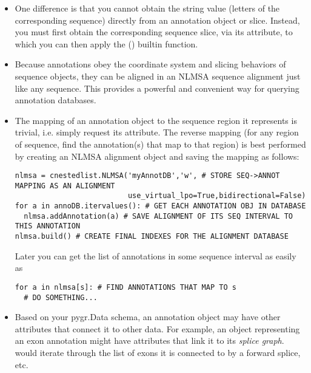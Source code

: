 \documentclass{howto}
\begin{document}
\begin{itemize}
\item One difference is that you cannot obtain the string value
(letters of the corresponding sequence) directly from an annotation
object or slice.  Instead, you must first obtain the corresponding
sequence slice, via its  attribute, to which
you can then apply the () builtin function.

\item Because annotations obey the
coordinate system and slicing behaviors of sequence objects,
they can be aligned in an NLMSA sequence alignment just like any
sequence.  This provides a powerful and convenient way for
querying annotation databases.

\item The mapping of an annotation object to the sequence region it
represents is trivial, i.e. simply request its  attribute.
The reverse mapping (for any region of sequence, find the annotation(s) 
that map to that region) is best performed by creating an NLMSA alignment
object and saving the mapping as follows:
\begin{verbatim}
nlmsa = cnestedlist.NLMSA('myAnnotDB','w', # STORE SEQ->ANNOT MAPPING AS AN ALIGNMENT
                          use_virtual_lpo=True,bidirectional=False)
for a in annoDB.itervalues(): # GET EACH ANNOTATION OBJ IN DATABASE
  nlmsa.addAnnotation(a) # SAVE ALIGNMENT OF ITS SEQ INTERVAL TO THIS ANNOTATION
nlmsa.build() # CREATE FINAL INDEXES FOR THE ALIGNMENT DATABASE
\end{verbatim}
Later you can get the list of annotations in some sequence interval 
as easily as 
\begin{verbatim}
for a in nlmsa[s]: # FIND ANNOTATIONS THAT MAP TO s
  # DO SOMETHING...
\end{verbatim}

\item Based on your pygr.Data schema, an annotation object may
have other attributes that connect it to other data.
For example, an object  representing an exon annotation
might have attributes that link it
to its {\em splice graph}.   would iterate
through the list of exons it is connected to by a forward splice, etc.

\end{itemize}
\end{document}
